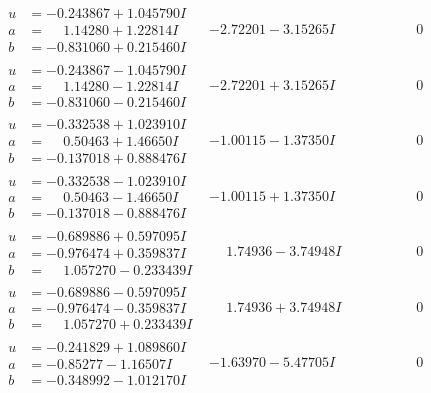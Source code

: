 \documentclass[1p]{elsarticle_modified}
\theoremstyle{definition}
\begin{document}
$$\begin{array}{c|c|c}
\begin{aligned}
u &= -0.243867 + 1.045790 I \\
a &= \phantom{-}1.14280 + 1.22814 I \\
b &= -0.831060 + 0.215460 I\end{aligned}
 & -2.72201 - 3.15265 I & \phantom{-0.000000 } 0 \\ \hline\begin{aligned}
u &= -0.243867 - 1.045790 I \\
a &= \phantom{-}1.14280 - 1.22814 I \\
b &= -0.831060 - 0.215460 I\end{aligned}
 & -2.72201 + 3.15265 I & \phantom{-0.000000 } 0 \\ \hline\begin{aligned}
u &= -0.332538 + 1.023910 I \\
a &= \phantom{-}0.50463 + 1.46650 I \\
b &= -0.137018 + 0.888476 I\end{aligned}
 & -1.00115 - 1.37350 I & \phantom{-0.000000 } 0 \\ \hline\begin{aligned}
u &= -0.332538 - 1.023910 I \\
a &= \phantom{-}0.50463 - 1.46650 I \\
b &= -0.137018 - 0.888476 I\end{aligned}
 & -1.00115 + 1.37350 I & \phantom{-0.000000 } 0 \\ \hline\begin{aligned}
u &= -0.689886 + 0.597095 I \\
a &= -0.976474 + 0.359837 I \\
b &= \phantom{-}1.057270 - 0.233439 I\end{aligned}
 & \phantom{-}1.74936 - 3.74948 I & \phantom{-0.000000 } 0 \\ \hline\begin{aligned}
u &= -0.689886 - 0.597095 I \\
a &= -0.976474 - 0.359837 I \\
b &= \phantom{-}1.057270 + 0.233439 I\end{aligned}
 & \phantom{-}1.74936 + 3.74948 I & \phantom{-0.000000 } 0 \\ \hline\begin{aligned}
u &= -0.241829 + 1.089860 I \\
a &= -0.85277 - 1.16507 I \\
b &= -0.348992 - 1.012170 I\end{aligned}
 & -1.63970 - 5.47705 I & \phantom{-0.000000 } 0 \\ \hline\begin{aligned}

\end{aligned}
\end{array}$$
\end{document}
